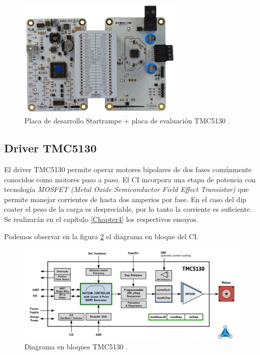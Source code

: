 \begin{figure}[htpb]
\centering 
\includegraphics[width=0.7\textwidth]{./Figures/tmc5130_placa.jpg}
\caption{Placa de desarrollo Startrampe + placa de evaluación TMC5130 \protect\footnotemark.}
\label{fig:tmc5130_placa}
\end{figure}



  
\subsection{Driver TMC5130}

El driver TMC5130 permite operar motores bipolares de dos fases comúnmente conocidos como motores paso a paso. El CI incorpora una etapa de potencia con tecnología \textit{MOSFET (Metal Oxide Semiconductor Field Effect Transistor)}  que permite manejar corrientes de hasta dos amperios por fase. En el caso del dip coater el peso de la carga es despreciable, por lo tanto la corriente es suficiente. Se realizarán en el capítulo \ref{Chapter4} los respectivos ensayos.

Podemos observar en la figura \ref{fig:tmc5130_diagrama} el diagrama en bloque del CI.

\begin{figure}[htpb]
\centering 
\includegraphics[width=1.1\textwidth]{./Figures/tmc5130_diagrama.png}
\caption{Diagrama en bloques TMC5130 \protect\footnotemark.}
\label{fig:tmc5130_diagrama}
\end{figure}

